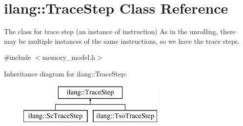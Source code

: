 \hypertarget{classilang_1_1_trace_step}{}\section{ilang\+:\+:Trace\+Step Class Reference}
\label{classilang_1_1_trace_step}


The class for trace step (an instance of instruction) As in the unrolling, there may be multiple instances of the same instructions, so we have the trace steps.  




{\ttfamily \#include $<$memory\+\_\+model.\+h$>$}

Inheritance diagram for ilang\+:\+:Trace\+Step\+:\begin{figure}[H]
\begin{center}
\leavevmode
\includegraphics[height=2.000000cm]{classilang_1_1_trace_step}
\end{center}
\end{figure}
